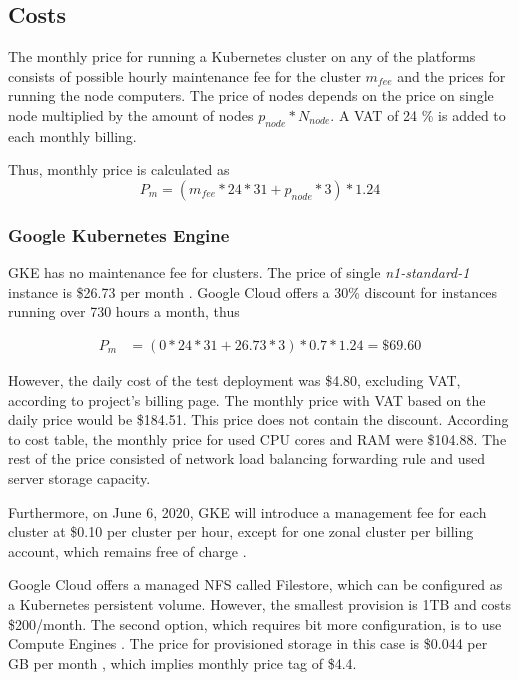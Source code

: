 \documentclass[article]{aaltoseries}
\begin{document}
\subsection{Costs}

The monthly price for running a Kubernetes cluster on any of the platforms consists of possible hourly maintenance fee for the cluster $m_{fee}$ and the prices for running the node computers. The price of nodes depends on the price on single node multiplied by the amount of nodes $p_{node} * N_{node}$. A VAT of 24 \% is added to each monthly billing.

Thus, monthly price is calculated as
\begin{equation}
    P_m = (m_{fee} * 24 * 31 + p_{node} * 3) * 1.24
\end{equation}

\subsubsection{Google Kubernetes Engine}

GKE has no maintenance fee for clusters. The price of single \textit{n1-standard-1} instance is \$26.73 per month \cite{gkeallpricing}. Google Cloud offers a 30\% discount for instances running over 730 hours a month, thus

\begin{equation}
\begin{split}
    P_m &= (0 * 24 * 31 + 26.73 * 3) * 0.7 * 1.24 = \$69.60
\end{split}
\end{equation}

However, the daily cost of the test deployment was \$4.80, excluding VAT, according to project's billing page. The monthly price with VAT based on the daily price would be \$184.51. This price does not contain the discount. According to cost table, the monthly price for used CPU cores and RAM were \$104.88. The rest of the price consisted of network load balancing forwarding rule and used server storage capacity.

Furthermore, on June 6, 2020, GKE will introduce a management fee for each cluster at \$0.10 per cluster per hour, except for one zonal cluster per billing account, which remains free of charge \cite{gkepricing}.

Google Cloud offers a managed NFS called Filestore, which can be configured as a Kubernetes persistent volume. However, the smallest provision is 1TB and costs \$200/month. The second option, which requires bit more configuration, is to use Compute Engines \cite{gkestorage}. The price for provisioned storage in this case is \$0.044 per GB per month \cite{gkestorageprice}, which implies monthly price tag of \$4.4.
\end{document}
